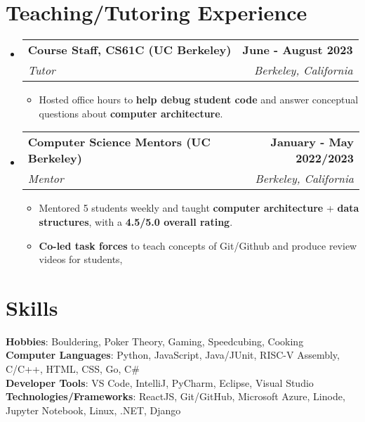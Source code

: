 \documentclass[letterpaper,11pt]{article}
\makeatletter
\newcommand{\resumeItem}[1]{
  \item\small{
    {#1 \vspace{-2pt}}
  }
}
\newcommand{\resumeSubheading}[4]{
  \vspace{-2pt}\item
    \begin{tabular*}{1.0\textwidth}[t]{l@{\extracolsep{\fill}}r}
      \textbf{#1} & \textbf{\small #2} \\
      \textit{\small#3} & \textit{\small #4} \\
    \end{tabular*}\vspace{-7pt}
}
\newcommand{\resumeSubHeadingListStart}{\begin{itemize}[leftmargin=0.0in, label={}]}
\newcommand{\resumeSubHeadingListEnd}{\end{itemize}}
\newcommand{\resumeItemListStart}{\begin{itemize}}
\newcommand{\resumeItemListEnd}{\end{itemize}\vspace{-5pt}}
\makeatother
\begin{document}
\section{Teaching/Tutoring Experience}
\resumeSubHeadingListStart

\resumeSubheading
{Course Staff, CS61C (UC Berkeley)}{June - August 2023}
{Tutor}{Berkeley, California}
\resumeItemListStart
  \resumeItem{Hosted office hours to \textbf{help debug student code} and answer conceptual questions about \textbf{computer architecture}. }
\resumeItemListEnd

\resumeSubheading
{Computer Science Mentors (UC Berkeley)}{January - May 2022/2023}
{Mentor}{Berkeley, California}
\resumeItemListStart
  \resumeItem{Mentored 5 students weekly and taught \textbf{computer architecture} + \textbf{data structures}, with a \textbf{4.5/5.0 overall rating}.}
  \resumeItem{\textbf{Co-led task forces} to teach concepts of Git/Github and produce review videos for students,}
  \resumeItemListEnd

\resumeSubHeadingListEnd
\vspace{-16pt}

\section{Skills}
 \begin{itemize}[leftmargin=0.15in, label={}]
    \small{\item{
     \textbf{Hobbies}: Bouldering, Poker Theory, Gaming, Speedcubing, Cooking \\
      \textbf{Computer Languages}{: Python, JavaScript, Java/JUnit, RISC-V Assembly, C/C++, HTML, CSS, Go, C\#} \\
      \textbf{Developer Tools}{: VS Code, IntelliJ, PyCharm, Eclipse, Visual Studio} \\
     \textbf{Technologies/Frameworks}{: ReactJS, Git/GitHub, Microsoft Azure, Linode, Jupyter Notebook, Linux, .NET, Django} \\
    }}

 \end{itemize}
 \vspace{-10pt}
 
                
\end{document}
